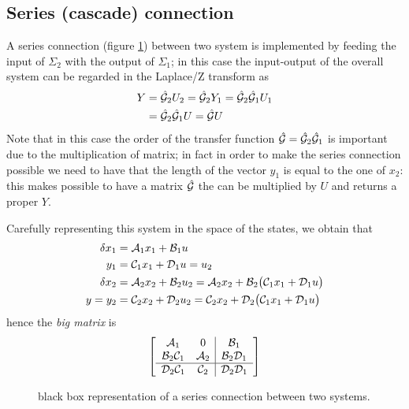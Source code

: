 	\subsection*{Series (cascade) connection}
		A series connection (figure \ref{fig:dyn:series}) between two system is implemented by feeding the input of $\Sigma_2$ with the output of $\Sigma_1$; in this case the input-output of the overall system can be regarded in the Laplace/Z transform as
		\begin{equation}
		\begin{aligned}
			Y & = \hat {\mathcal{G}}_2 U_2 = \hat {\mathcal{G}}_2 Y_1 = \hat {\mathcal{G}}_2 \hat {\mathcal{G}}_1 U_1 \\ & = \hat {\mathcal{G}}_2 \hat {\mathcal{G}}_1  U = \hat {\mathcal{G}} U
		\end{aligned}
		\end{equation}
		Note that in this case the order of the transfer function $\hat {\mathcal{G}}= \hat {\mathcal{G}}_2 \hat {\mathcal{G}}_1$ is important due to the multiplication of matrix; in fact in order to make the series connection possible we need to have that the length of the vector $y_1$ is equal to the one of $x_2$: this makes possible to have a matrix $\hat {\mathcal{G}}$ the can be multiplied by $U$ and returns a proper $Y$.
	
		Carefully representing this system in the space of the states, we obtain that
		\begin{align*}
			\delta x_1 & = \mathcal{A}_1 x_1 + \mathcal{B}_1 u \\
			y_1 & = \mathcal{C}_1 x_1 + \mathcal{D}_1 u = u_2 \\
			\delta x_2 & = \mathcal{A}_2 x_2 + \mathcal{B}_2 u_2 = \mathcal{A}_2 x_2 + \mathcal{B}_2\big( \mathcal{C}_1 x_1 + \mathcal{D}_1 u \big) \\
			y= y_2 & = \mathcal{C}_2 x_2 + \mathcal{D}_2 u_2 = \mathcal{C}_2 x_2 + \mathcal{D}_2 \big(\mathcal{C}_1 x_1 + \mathcal{D}_1 u\big)
		\end{align*}
		hence the \textit{big matrix} is
		\begin{equation}
			\begin{bmatrix}  \begin{array} {c c | c}
					\mathcal{A}_1 & 0 & \mathcal{B}_1 \\ 
					\mathcal{B}_2 \mathcal{C}_1 & \mathcal{A}_2 & \mathcal{B}_2 \mathcal{D}_1 \\ \hline 
					\mathcal{D}_2 \mathcal{C}_1 & \mathcal{C}_2 & \mathcal{D}_2\mathcal{D}_1
			\end{array}  \end{bmatrix}
		\end{equation}
		
		\begin{figure}[bht]
			\centering
			\caption{black box representation of a series connection between two systems.} \label{fig:dyn:series}
		\end{figure}
	
